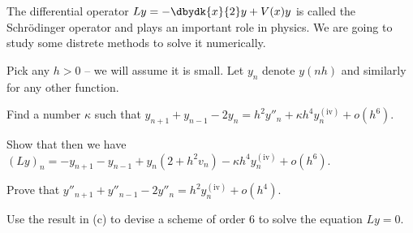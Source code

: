 The differential operator $Ly=-\dbydk{x}{2}y+V(x)y$ is called the
Schr\"odinger operator and plays an important role in physics. We are
going to study some distrete methods to solve it numerically.

Pick any $h>0$ -- we will assume it is small. Let $y_n$ denote $y(nh)$
and similarly for any other function.
\begin{alist}
\item Find a number $\kappa$ such that
$y_{n+1}+y_{n-1}-2y_n=h^2y''_n+\kappa h^4 y_n^{(\mathrm{iv})}+o(h^6)$.
\item Show that then we have
$(Ly)_n=-y_{n+1}-y_{n-1}+y_n(2+h^2v_n)-\kappa h^4
y_n^{(\mathrm{iv})}+o(h^6)$.
\item Prove that $y''_{n+1}+y''_{n-1}-2y''_n=h^2
y_n^{(\mathrm{iv})}+o(h^4)$.
\item Use the result in (c) to devise a scheme of order $6$ to solve
the equation $Ly=0$.
\end{alist}
